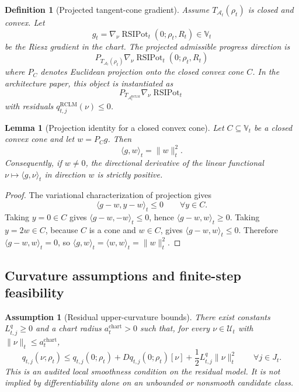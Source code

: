 \documentclass[11pt]{article}
\newtheorem{lemma}[theorem]{Lemma}
\newtheorem{definition}[theorem]{Definition}
\newtheorem{assumption}[theorem]{Assumption}
\newcommand{\1}{\mathbf{1}}
\providecommand{\RCLM}{\mathrm{RCLM}}
\begin{document}
\begin{definition}[Projected tangent-cone gradient]
\label{def:projected_tangent_cone_gradient}
Assume \(T_{\mathcal A_t}(\rho_t)\) is closed and convex.  Let
\[
g_t=\nabla_\nu\operatorname{RSIPot}_t(0;\rho_t,R_t)
\in\mathbb V_t
\]
be the Riesz gradient in the chart.  The projected admissible progress direction is
\[
\boxed{
P_{T_{\mathcal A_t}(\rho_t)}\nabla_\nu\operatorname{RSIPot}_t(0;\rho_t,R_t)
}
\]
where \(P_C\) denotes Euclidean projection onto the closed convex cone \(C\).  In the architecture paper, this object is instantiated as
\[
P_{T_{\mathcal A_t^{\RCLM}}}\nabla_\nu\operatorname{RSIPot}_t
\]
with residuals \(q_{t,j}^{\RCLM}(\nu)\le0\).
\end{definition}

\begin{lemma}[Projection identity for a closed convex cone]
\label{lem:projection_identity_cone}
Let \(C\subseteq\mathbb V_t\) be a closed convex cone and let \(w=P_C g\).  Then
\[
\langle g,w\rangle_t=\|w\|_t^2.
\]
Consequently, if \(w\ne0\), the directional derivative of the linear functional \(\nu\mapsto\langle g,\nu\rangle_t\) in direction \(w\) is strictly positive.
\end{lemma}

\begin{proof}
The variational characterization of projection gives
\[
\langle g-w,y-w\rangle_t\le0
\qquad\forall y\in C.
\]
Taking \(y=0\in C\) gives \(\langle g-w,-w\rangle_t\le0\), hence \(\langle g-w,w\rangle_t\ge0\).  Taking \(y=2w\in C\), because \(C\) is a cone and \(w\in C\), gives \(\langle g-w,w\rangle_t\le0\).  Therefore \(\langle g-w,w\rangle_t=0\), so \(\langle g,w\rangle_t=\langle w,w\rangle_t=\|w\|_t^2\).
\end{proof}

\subsection{Curvature assumptions and finite-step feasibility}

\begin{assumption}[Residual upper-curvature bounds]
\label{ass:residual_upper_curvature_bounds}
There exist constants \(L_{t,j}^{q}\ge0\) and a chart radius \(a_t^{\mathrm{chart}}>0\) such that, for every \(\nu\in\mathcal U_t\) with \(\|\nu\|_t\le a_t^{\mathrm{chart}}\),
\[
q_{t,j}(\nu;\rho_t)
\le
q_{t,j}(0;\rho_t)
+Dq_{t,j}(0;\rho_t)[\nu]
+\frac12 L_{t,j}^{q}\|\nu\|_t^2
\qquad\forall j\in J_t.
\]
This is an audited local smoothness condition on the residual model.  It is not implied by differentiability alone on an unbounded or nonsmooth candidate class.
\end{assumption}
\end{document}
